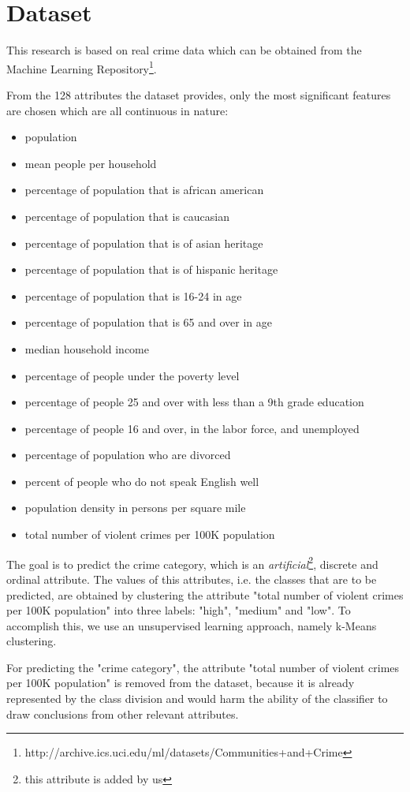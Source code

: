 \section{Dataset}

This research is based on real crime data which can be obtained from the Machine Learning
Repository\footnote{http://archive.ics.uci.edu/ml/datasets/Communities+and+Crime}.

From the 128 attributes the dataset provides, only the most significant features are chosen which are all
continuous in nature:

\begin{itemize}
	\setlength{\itemsep}{-2pt}
	\item population 
	\item mean people per household
	\item percentage of population that is african american
	\item percentage of population that is caucasian
	\item percentage of population that is of asian heritage 
	\item percentage of population that is of hispanic heritage
	\item percentage of population that is 16-24 in age
	\item percentage of population that is 65 and over in age 
	\item median household income
	\item percentage of people under the poverty level
	\item percentage of people 25 and over with less than a 9th grade education 
	\item percentage of people 16 and over, in the labor force, and unemployed 
	\item percentage of population who are divorced
	\item percent of people who do not speak English well 
	\item population density in persons per square mile
	\item total number of violent crimes per 100K population 
\end{itemize}

The goal is to predict the crime category, which is an
\textit{artificial}\footnote{this attribute is added by us}, discrete and ordinal attribute.
The values of this attributes, i.e.
the classes that are to be predicted, are obtained by clustering the attribute "total number of violent
crimes per 100K population" into three labels: "high", "medium" and "low". To accomplish this, we use an
unsupervised learning approach, namely k-Means clustering.

For predicting the "crime category", the attribute "total number of violent crimes per 100K population" is
removed from the dataset, because it is already represented by the class division and would harm the ability
of the classifier to draw conclusions from other relevant attributes.
